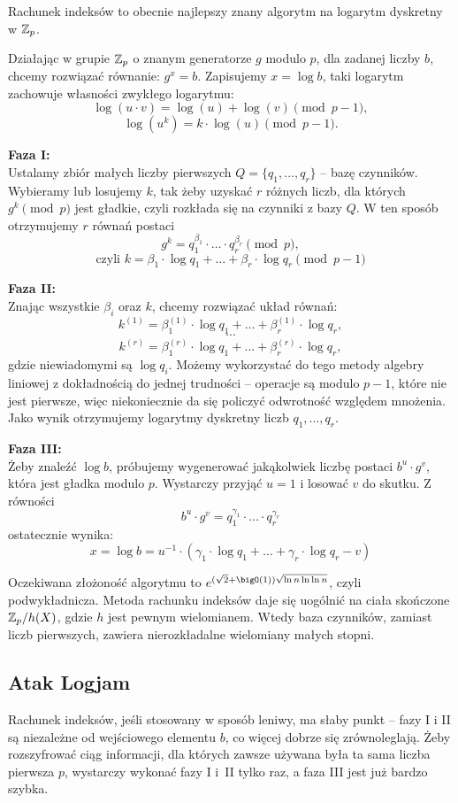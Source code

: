 Rachunek indeksów to obecnie najlepszy znany algorytm na logarytm dyskretny w \( \mathbb{Z}_p \).

Działając w grupie \( \mathbb{Z}_p \) o znanym generatorze \( g \) modulo \( p \), dla zadanej liczby \( b \), chcemy rozwiązać równanie: \( g^x = b \).
Zapisujemy \( x = \log b \), taki logarytm zachowuje własności zwykłego logarytmu:
\[
    \log(u \cdot v) = \log(u) + \log(v) \pmod{p-1},
\]
\[
    \log(u^k) = k \cdot \log(u) \pmod{p-1}.
\]

\textbf{Faza I:} \\
Ustalamy zbiór małych liczby pierwszych \( Q = \{q_1, \dots, q_r\} \) -- bazę czynników.
Wybieramy lub losujemy \( k \), tak żeby uzyskać \( r \) różnych liczb, dla których \( g^k \pmod{p} \) jest gładkie, czyli rozkłada się na czynniki z bazy \( Q \). W ten sposób otrzymujemy \( r \) równań postaci
\[
    g^k = q_1^{\beta_1} \cdot \ldots \cdot q_r^{\beta_r} \pmod{p},
\]
\[
    \text{czyli } k = \beta_1 \cdot \log q_1 + \ldots + \beta_r \cdot \log q_r \pmod{p - 1}
\]

\textbf{Faza II:} \\
Znając wszystkie \( \beta_i \) oraz \( k \), chcemy rozwiązać układ równań:
\[
    k^{(1)} = \beta_1^{(1)} \cdot \log q_1 + \ldots + \beta_r^{(1)} \cdot \log q_r,
\]
\[
    \cdots
\]
\[
    k^{(r)} = \beta_1^{(r)} \cdot \log q_1 + \ldots + \beta_r^{(r)} \cdot \log q_r,
\]
gdzie niewiadomymi są \( \log q_i \). Możemy wykorzystać do tego metody algebry liniowej z dokładnością do jednej trudności -- operacje są modulo \( p-1 \), które nie jest pierwsze, więc niekoniecznie da się policzyć odwrotność względem mnożenia.
Jako wynik otrzymujemy logarytmy dyskretny liczb \( q_1, \dots, q_r \).

\textbf{Faza III:} \\
Żeby znaleźć \( \log b \), próbujemy wygenerować jakąkolwiek liczbę postaci \( b^u \cdot g^v \), która jest gładka modulo \( p \). Wystarczy przyjąć \( u = 1 \) i losować \( v \) do skutku. Z równości
\[ b^u \cdot g^v = q_1^{\gamma_1} \cdot \ldots \cdot q_r^{\gamma_r} \]
ostatecznie wynika:
\[ x = \log b = u^{-1} \cdot (\gamma_1 \cdot \log q_1 + \ldots + \gamma_r \cdot \log q_r - v) \]

Oczekiwana złożoność algorytmu to \( e^{(\sqrt{2}+\bigO(1))\sqrt{\ln n \ln\ln n}} \), czyli podwykładnicza. Metoda rachunku indeksów daje się uogólnić na ciała skończone \( \mathbb{Z}_p/h(X) \), gdzie \( h \) jest pewnym wielomianem. Wtedy baza czynników, zamiast liczb pierwszych, zawiera nierozkładalne wielomiany małych stopni.

\subsection{Atak Logjam}
Rachunek indeksów, jeśli stosowany w sposób leniwy, ma słaby punkt -- fazy I i II są niezależne od wejściowego elementu \( b \), co więcej dobrze się zrównoleglają.
Żeby rozszyfrować ciąg informacji, dla których zawsze używana była ta sama liczba pierwsza \( p \), wystarczy wykonać fazy I i~II tylko raz, a faza III jest już bardzo szybka.
